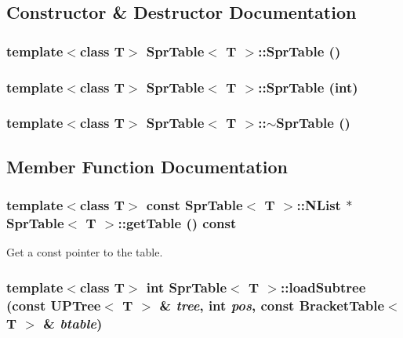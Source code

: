 \subsection{Constructor \& Destructor Documentation}
\subsubsection{\setlength{\rightskip}{0pt plus 5cm}template$<$class T$>$ {\bf Spr\-Table}$<$ T $>$::{\bf Spr\-Table} ()}\label{classSprTable_a0}


\subsubsection{\setlength{\rightskip}{0pt plus 5cm}template$<$class T$>$ {\bf Spr\-Table}$<$ T $>$::{\bf Spr\-Table} (int)}\label{classSprTable_a1}


\subsubsection{\setlength{\rightskip}{0pt plus 5cm}template$<$class T$>$ {\bf Spr\-Table}$<$ T $>$::$\sim${\bf Spr\-Table} ()}\label{classSprTable_a2}




\subsection{Member Function Documentation}
\subsubsection{\setlength{\rightskip}{0pt plus 5cm}template$<$class T$>$ const {\bf Spr\-Table}$<$ T $>$::{\bf NList} $\ast$ {\bf Spr\-Table}$<$ T $>$::get\-Table () const\hspace{0.3cm}{\tt  [inline]}}\label{classSprTable_a6}


Get a const pointer to the table. 

\subsubsection{\setlength{\rightskip}{0pt plus 5cm}template$<$class T$>$ int {\bf Spr\-Table}$<$ T $>$::load\-Subtree (const {\bf UPTree}$<$ T $>$ \& {\em tree}, int {\em pos}, const {\bf Bracket\-Table}$<$ T $>$ \& {\em btable})}\label{classSprTable_a5}


